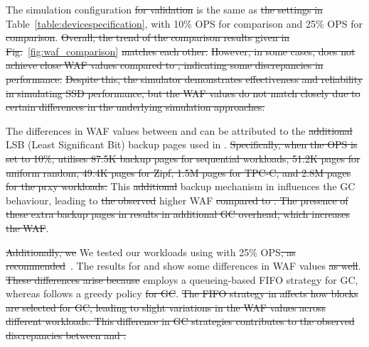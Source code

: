 \documentclass{ieeeaccess}
\begin{document}
The simulation configuration \sout{for validation} is the same as \sout{the settings in} Table~\ref{table:devicespecification}, with 10\% OPS for \ftlsim comparison and 25\% OPS for \femu \sout{comparison}.
\sout{Overall, the trend of the comparison results given in Fig.}~\ref{fig:waf_comparison} \sout{matches each other.}
\sout{However, in some cases, \eyanassdsim does not achieve close WAF values compared to \ftlsim, indicating some discrepancies in performance.}
\sout{Despite this, the simulator demonstrates effectiveness and reliability in simulating SSD performance, but the WAF values do not match closely due to certain differences in the underlying simulation approaches.}

The differences in WAF values between \eyanassdsim and \ftlsim can be attributed to the \sout{additional} LSB (Least Significant Bit) backup pages used in \ftlsim. \sout{Specifically, when the OPS is set to 10\%, \ftlsim utilises 87.5K backup pages for sequential workloads, 51.2K pages for uniform random, 49.4K pages for Zipf, 1.5M pages for TPC-C, and 2.8M pages for the prxy workloads.} This \sout{additional} backup mechanism in \ftlsim influences the GC behaviour, leading to \sout{the observed} higher WAF \sout{compared to \eyanassdsim. The presence of these extra backup pages in \ftlsim results in additional GC overhead, which increases the WAF}.

\sout{Additionally, we} We tested our workloads using \femu with 25\% OPS\sout{, as recommended}~\cite{FEMU_Blackbox_2024}. The results for \eyanassdsim and \femu show some differences in WAF values \sout{as well}. \sout{These differences arise because} \femu employs a queueing-based FIFO strategy for GC, whereas \eyanassdsim follows a greedy policy\sout{ for GC}.
\sout{The FIFO strategy in \femu affects how blocks are selected for GC, leading to slight variations in the WAF values across different workloads. This difference in GC strategies contributes to the observed discrepancies between \eyanassdsim and \femu.}
\end{document}
